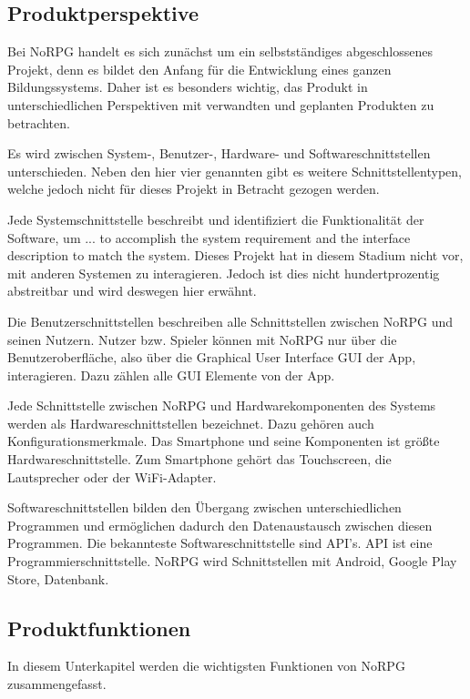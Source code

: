 	\subsection{Produktperspektive}
		Bei NoRPG handelt es sich zunächst um ein selbstständiges abgeschlossenes Projekt, denn es bildet den Anfang für die Entwicklung eines ganzen Bildungssystems. Daher ist es besonders wichtig, das Produkt in unterschiedlichen Perspektiven mit verwandten und geplanten Produkten zu betrachten. 
		
		Es wird zwischen System-, Benutzer-, Hardware- und Softwareschnittstellen unterschieden. Neben den hier vier genannten gibt es weitere Schnittstellentypen, welche jedoch nicht für dieses Projekt in Betracht gezogen werden. 
		
		Jede Systemschnittstelle beschreibt und identifiziert die Funktionalität der Software, um ... to accomplish the system requirement and the interface description to match the system. Dieses Projekt hat in diesem Stadium nicht vor, mit anderen Systemen zu interagieren. Jedoch ist dies nicht hundertprozentig abstreitbar und wird deswegen hier erwähnt.

		Die Benutzerschnittstellen beschreiben alle Schnittstellen zwischen NoRPG und seinen Nutzern. Nutzer bzw. Spieler können mit NoRPG nur über die Benutzeroberfläche, also über die Graphical User Interface GUI der App, interagieren. Dazu zählen alle GUI Elemente von der App.
		
		Jede Schnittstelle zwischen NoRPG und Hardwarekomponenten des Systems werden als Hardwareschnittstellen bezeichnet. Dazu gehören auch Konfigurationsmerkmale. Das Smartphone und seine Komponenten ist größte Hardwareschnittstelle. Zum Smartphone gehört das Touchscreen, die Lautsprecher oder der WiFi-Adapter. %
		
		Softwareschnittstellen bilden den Übergang zwischen unterschiedlichen Programmen und ermöglichen dadurch den Datenaustausch zwischen diesen Programmen. Die bekannteste Softwareschnittstelle sind API's. API ist eine Programmierschnittstelle. NoRPG wird Schnittstellen mit Android, Google Play Store, Datenbank.

	\subsection{Produktfunktionen}
		In diesem Unterkapitel werden die wichtigsten Funktionen von NoRPG zusammengefasst.
		
